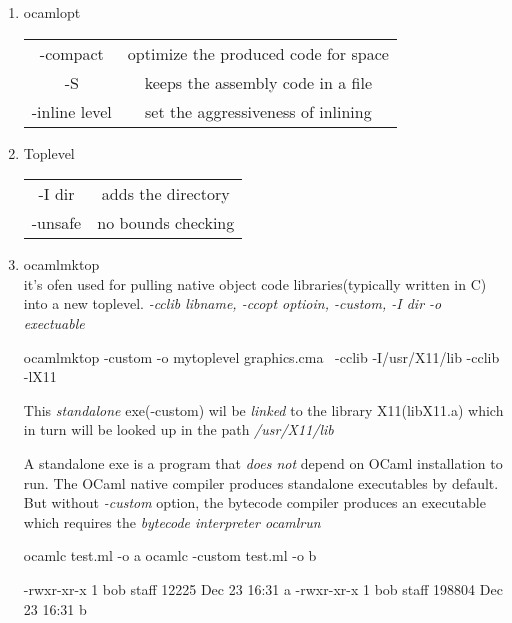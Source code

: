 \begin{enumerate}
\item ocamlopt   \\
  \begin{tabular}{|c|c|}
    -compact & optimize the produced code for space \\
    -S & keeps the assembly code in a file \\
    -inline level & set the aggressiveness of inlining \\
  \end{tabular}

\item Toplevel
  \begin{tabular}{|c|c|}
    -I dir & adds the directory \\
    -unsafe & no bounds checking \\
  \end{tabular}
\item ocamlmktop \\
  it's ofen used for pulling native object code libraries(typically written in C) into
  a new toplevel.
  \textit{
    -cclib libname, -ccopt optioin, -custom, -I dir -o exectuable
  }

  \begin{bluetext}
    ocamlmktop -custom -o mytoplevel graphics.cma \
    -cclib -I/usr/X11/lib -cclib -lX11
  \end{bluetext}
  
  This \textit{standalone} exe(-custom) wil be \textit{linked} to the library X11(libX11.a) which in turn will be looked up in the path \textit{/usr/X11/lib}

  A standalone exe is a program that \textit{does not } depend on OCaml installation to run.
  The OCaml native compiler produces standalone executables by default. But without \textit{-custom} option, the bytecode compiler produces an executable which requires the \textit{bytecode interpreter ocamlrun}

  \begin{redcode}
ocamlc test.ml -o a
ocamlc -custom test.ml -o b
\end{redcode}

\begin{bluecode}
-rwxr-xr-x   1 bob  staff    12225 Dec 23 16:31 a
-rwxr-xr-x   1 bob  staff   198804 Dec 23 16:31 b
\end{bluecode}



\end{enumerate}
